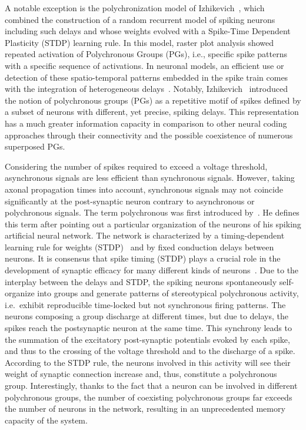 \documentclass[brainsci, %
               review,submit,pdftex,moreauthors%
               ]{Definitions/mdpi}
\begin{document}
A notable exception is the polychronization model of Izhikevich~\citep{izhikevich_polychronization_2006}, which combined the construction of a random recurrent model of spiking neurons including such delays and whose weights evolved with a Spike-Time Dependent Plasticity (STDP) learning rule. In this model, raster plot analysis showed repeated activation of Polychronous Groups (PGs), i.e., specific spike patterns with a specific sequence of activations. In neuronal models, an efficient use or detection of these spatio-temporal patterns embedded in the spike train comes with the integration of heterogeneous delays~\citep{guise_bayesian_2014,zhang_supervised_2020}. Notably, Izhikevich~\citep{izhikevich_polychronization_2006} introduced the notion of polychronous groups (PGs) as a repetitive motif of spikes defined by a subset of neurons with different, yet precise, spiking delays. This representation has a much greater information capacity in comparison to other neural coding approaches through their connectivity and the possible coexistence of numerous superposed PGs.

Considering the number of spikes required to exceed a voltage threshold, asynchronous signals are less efficient than synchronous signals. However, taking axonal propagation times into account, synchronous signals may not coincide significantly at the post-synaptic neuron contrary to asynchronous or polychronous signals. The term polychronous was first introduced by~\citet{izhikevich_polychronization_2006}. He defines this term after pointing out a particular organization of the neurons of his spiking artificial neural network. The network is characterized by a timing-dependent learning rule for weights (STDP)~\citep{markram_regulation_1997} and by fixed conduction delays between neurons. It is consensus that spike timing (STDP) plays a crucial role in the development of synaptic efficacy for many different kinds of neurons~\citep{caporale_spike_2008}. Due to the interplay between the delays and STDP, the spiking neurons spontaneously self-organize into groups and generate patterns of stereotypical polychronous activity, i.e.~exhibit reproducible time-locked but not synchronous firing patterns. The neurons composing a group discharge at different times, but due to delays, the spikes reach the postsynaptic neuron at the same time. This synchrony leads to the summation of the excitatory post-synaptic potentials evoked by each spike, and thus to the crossing of the voltage threshold and to the discharge of a spike. According to the STDP rule, the neurons involved in this activity will see their weight of synaptic connection increase and, thus, constitute a polychronous group. Interestingly, thanks to the fact that a neuron can be involved in different polychronous groups, the number of coexisting polychronous groups far exceeds the number of neurons in the network, resulting in an unprecedented memory capacity of the system.
\end{document}
